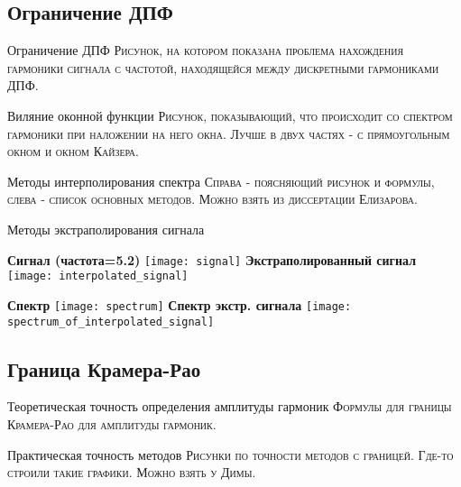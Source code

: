 \subsection{Ограничение ДПФ}
\begin{frame}{Ограничение ДПФ}
	\textsc{Рисунок, на котором показана проблема нахождения гармоники сигнала с частотой, находящейся между дискретными гармониками ДПФ.}
\end{frame}

\begin{frame}{Виляние оконной функции}
	\textsc{Рисунок, показывающий, что происходит со спектром гармоники при наложении на него окна. Лучше в двух частях - с прямоугольным окном и окном Кайзера.}	
\end{frame}

\begin{frame}{Методы интерполирования спектра}
	\textsc{Справа - поясняющий рисунок и формулы, слева - список основных методов.
	Можно взять из диссертации Елизарова.}	
\end{frame}

\begin{frame}{Методы экстраполирования сигнала}
	\begin{minipage}[t]{0.47\linewidth}
		\centering 
		\textbf{Сигнал (частота=5.2)}
		\texttt{[image: signal]}
		\textbf{Экстраполированный сигнал }
		\texttt{[image: interpolated\_signal]}		
	\end{minipage}
	\hfill
	\begin{minipage}[t]{0.47\linewidth}
		\centering 
		\textbf{Спектр}
		\texttt{[image: spectrum]}
		\textbf{Спектр экстр. сигнала}
		\texttt{[image: spectrum\_of\_interpolated\_signal]}
	\end{minipage}
\end{frame}

\subsection{Граница Крамера-Рао}
\begin{frame}{Теоретическая точность определения амплитуды гармоник}
	\textsc{Формулы для границы Крамера-Рао для амплитуды гармоник.}
\end{frame}


\begin{frame}{Практическая точность методов}
	\textsc{Рисунки по точности методов с границей.
	Где-то строили такие графики. Можно взять у Димы.}
\end{frame}

